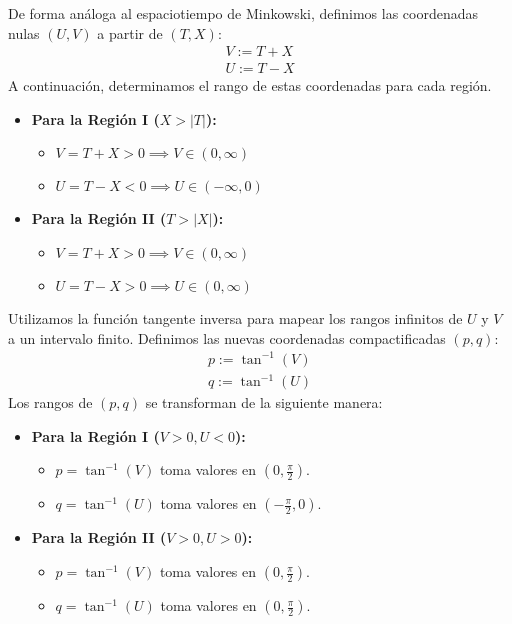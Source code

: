 De forma análoga al espaciotiempo de Minkowski, definimos las coordenadas nulas $(U, V)$ a partir de $(T, X)$:
\begin{equation}
  \begin{array}{l}
    V := T+X \\
    U := T-X
  \end{array}
\end{equation}
A continuación, determinamos el rango de estas coordenadas para cada región.

\begin{itemize}
  \item \textbf{Para la Región I ($X > |T|$):}
        \begin{itemize}
          \item $V = T+X > 0 \implies V \in (0, \infty)$
          \item $U = T-X < 0 \implies U \in (-\infty, 0)$
        \end{itemize}

  \item \textbf{Para la Región II ($T > |X|$):}
        \begin{itemize}
          \item $V = T+X > 0 \implies V \in (0, \infty)$
          \item $U = T-X > 0 \implies U \in (0, \infty)$
        \end{itemize}
\end{itemize}



Utilizamos la función tangente inversa para mapear los rangos infinitos de $U$ y $V$ a un intervalo finito. Definimos las nuevas coordenadas compactificadas $(p, q)$:
\begin{equation}
  \begin{array}{l}
    p := \tan^{-1}(V) \\
    q := \tan^{-1}(U)
  \end{array}
\end{equation}
Los rangos de $(p, q)$ se transforman de la siguiente manera:

\begin{itemize}
  \item \textbf{Para la Región I ($V>0, U<0$):}
        \begin{itemize}
          \item $p = \tan^{-1}(V)$ toma valores en $\left(0, \frac{\pi}{2}\right)$.
          \item $q = \tan^{-1}(U)$ toma valores en $\left(-\frac{\pi}{2}, 0\right)$.
        \end{itemize}

  \item \textbf{Para la Región II ($V>0, U>0$):}
        \begin{itemize}
          \item $p = \tan^{-1}(V)$ toma valores en $\left(0, \frac{\pi}{2}\right)$.
          \item $q = \tan^{-1}(U)$ toma valores en $\left(0, \frac{\pi}{2}\right)$.
        \end{itemize}
\end{itemize}



